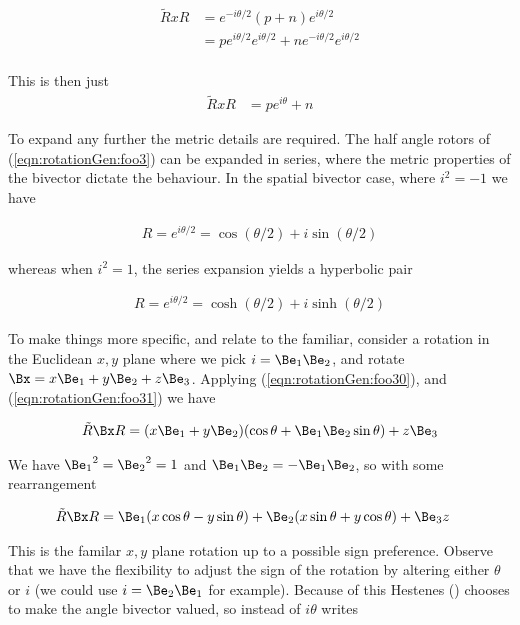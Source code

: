 \begin{align*}
\tilde{R} x R 
&=
e^{-i \theta/2} (p + n) e^{i \theta/2} \\
&=
p e^{i \theta/2} e^{i \theta/2} 
+ 
n e^{-i \theta/2} e^{i \theta/2} \\
\end{align*}

This is then just
\begin{align}\label{eqn:rotationGen:foo30}
\tilde{R} x R 
&=
p e^{i \theta} + n 
\end{align}

To expand any further the metric details are required.  The half angle rotors of (\ref{eqn:rotationGen:foo3}) can be expanded in series, where the metric properties of the bivector dictate the behaviour.  In the spatial bivector case, where $i^2 = -1$ we have

\begin{align}\label{eqn:rotationGen:foo31}
R = e^{i \theta/2} = \cos(\theta/2) + i\sin(\theta/2)
\end{align}

whereas when $i^2 = 1$, the series expansion yields a hyperbolic pair

\begin{align}\label{eqn:rotationGen:foo32}
R = e^{i \theta/2} = \cosh(\theta/2) + i\sinh(\theta/2)
\end{align}

To make things more specific, and relate to the familiar, consider a rotation in the Euclidean $x,y$ plane where we pick $i = \Be_1 \Be_2$, and rotate $\Bx = x \Be_1 + y \Be_2 + z \Be_3$.  Applying (\ref{eqn:rotationGen:foo30}), and (\ref{eqn:rotationGen:foo31}) we have

\begin{align*}
\tilde{R} \Bx R 
&=
(x \Be_1 + y \Be_2) (\cos\theta + \Be_1 \Be_2 \sin\theta) + z \Be_3 \\
\end{align*}

We have ${\Be_1}^2 = {\Be_2}^2 = 1$ and $\Be_1 \Be_2 = -\Be_1 \Be_2$, so with some rearrangement

\begin{align*}
\tilde{R} \Bx R 
&=
\Be_1 (x \cos\theta - y \sin\theta )
+\Be_2 (x \sin\theta + y \cos\theta )
+ \Be_3 z
\end{align*}

This is the familar $x,y$ plane rotation up to a possible sign preference.  Observe that we have the flexibility to adjust the sign of the rotation by altering either $\theta$ or $i$ (we could use $i = \Be_2 \Be_1$ for example).  Because of this Hestenes (\cite{hestenes1999nfc}) chooses to make the angle bivector valued, so instead of $i\theta$ writes

